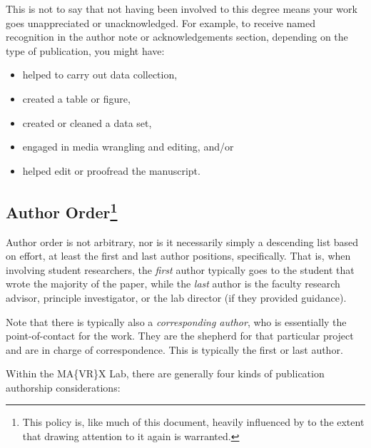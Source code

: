 \documentclass[
]{book}
\providecommand{\tightlist}{%
  \setlength{\itemsep}{0pt}\setlength{\parskip}{0pt}}
\begin{document}
This is not to say that not having been involved to this degree means your work goes unappreciated or unacknowledged. For example, to receive named recognition in the author note or acknowledgements section, depending on the type of publication, you might have:

\begin{itemize}
\tightlist
\item
  helped to carry out data collection,
\item
  created a table or figure,
\item
  created or cleaned a data set,
\item
  engaged in media wrangling and editing, and/or
\item
  helped edit or proofread the manuscript.
\end{itemize}

\hypertarget{author-order}{%
\subsection[Author Order]{\texorpdfstring{Author Order\footnote{This policy is, like much of this document, heavily influenced by \citet{Minda_Nielsen_2018} to the extent that drawing attention to it again is warranted.}}{Author Order}}\label{author-order}}

Author order is not arbitrary, nor is it necessarily simply a descending list based on effort, at least the first and last author positions, specifically. That is, when involving student researchers, the \emph{first} author typically goes to the student that wrote the majority of the paper, while the \emph{last} author is the faculty research advisor, principle investigator, or the lab director (if they provided guidance).

Note that there is typically also a \emph{corresponding author}, who is essentially the point-of-contact for the work. They are the shepherd for that particular project and are in charge of correspondence. This is typically the first or last author.

Within the MA\{VR\}X Lab, there are generally four kinds of publication authorship considerations:
\end{document}
